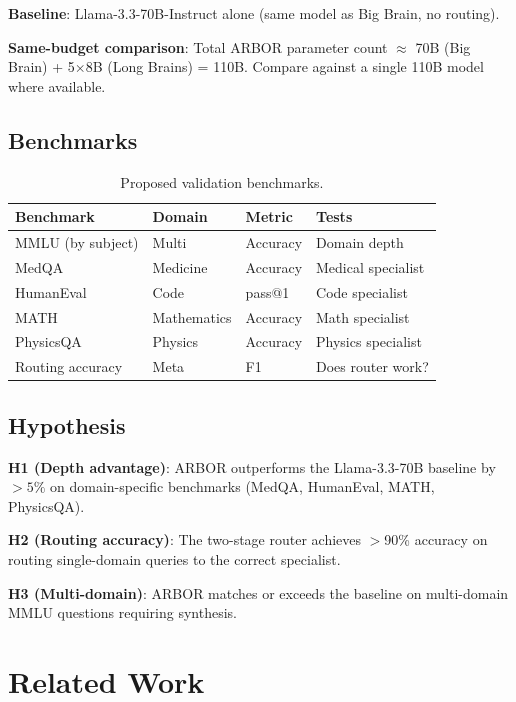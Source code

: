 \documentclass[12pt]{article}
\begin{document}
\textbf{Baseline}: Llama-3.3-70B-Instruct alone (same model as Big Brain, no routing).

\textbf{Same-budget comparison}: Total ARBOR parameter count $\approx$ 70B (Big Brain) + 5$\times$8B (Long Brains) = 110B. Compare against a single 110B model where available.

\subsection{Benchmarks}

\begin{table}[H]
\centering
\small
\begin{tabular}{llll}
\toprule
\textbf{Benchmark} & \textbf{Domain} & \textbf{Metric} & \textbf{Tests} \\
\midrule
MMLU (by subject) \cite{hendrycks2021} & Multi & Accuracy & Domain depth \\
MedQA \cite{jin2021} & Medicine & Accuracy & Medical specialist \\
HumanEval \cite{chen2021} & Code & pass@1 & Code specialist \\
MATH \cite{hendrycks2021math} & Mathematics & Accuracy & Math specialist \\
PhysicsQA & Physics & Accuracy & Physics specialist \\
Routing accuracy & Meta & F1 & Does router work? \\
\bottomrule
\end{tabular}
\caption{Proposed validation benchmarks.}
\end{table}

\subsection{Hypothesis}

\textbf{H1 (Depth advantage)}: ARBOR outperforms the Llama-3.3-70B baseline by $>5\%$ on domain-specific benchmarks (MedQA, HumanEval, MATH, PhysicsQA).

\textbf{H2 (Routing accuracy)}: The two-stage router achieves $>$90\% accuracy on routing single-domain queries to the correct specialist.

\textbf{H3 (Multi-domain)}: ARBOR matches or exceeds the baseline on multi-domain MMLU questions requiring synthesis.

\section{Related Work}
\end{document}
